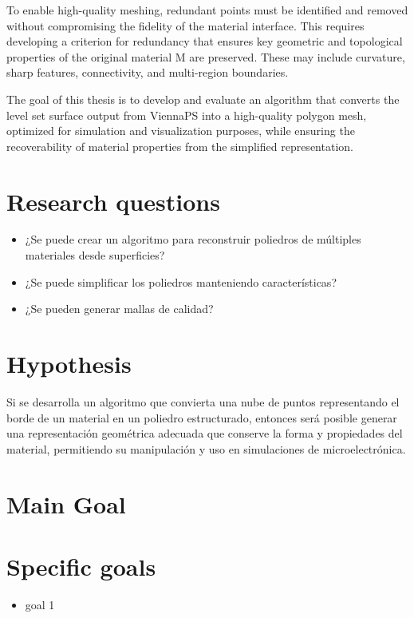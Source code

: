 \documentclass[submission]{eptcs}
\begin{document}
To enable high-quality meshing, redundant points must be identified and removed without compromising the fidelity of the material interface. This requires developing a criterion for redundancy that ensures key geometric and topological properties of the original material M are preserved. These may include curvature, sharp features, connectivity, and multi-region boundaries.

The goal of this thesis is to develop and evaluate an algorithm that converts the level set surface output from ViennaPS into a high-quality polygon mesh, optimized for simulation and visualization purposes, while ensuring the recoverability of material properties from the simplified representation.

\section{Research questions}

\begin{itemize}
    \item ¿Se puede crear un algoritmo para reconstruir poliedros de múltiples materiales desde superficies?
    \item ¿Se puede simplificar los poliedros manteniendo características?
    \item ¿Se pueden generar mallas de calidad?
\end{itemize}


\section{Hypothesis}

Si se desarrolla un algoritmo que convierta una nube de puntos representando el borde de un material en un poliedro estructurado, entonces será posible generar una representación geométrica adecuada que conserve la forma y propiedades del material, permitiendo su manipulación y uso en simulaciones de microelectrónica.

\section{Main Goal}


\section{Specific goals}

\begin{itemize}
\item goal 1
\end{itemize}
\end{document}
